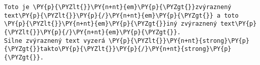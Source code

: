 \begin{Verbatim}[commandchars=\\\{\}]
Toto je \PY{p}{\PYZlt{}}\PY{n+nt}{em}\PY{p}{\PYZgt{}}zvýraznený text\PY{p}{\PYZlt{}}\PY{p}{/}\PY{n+nt}{em}\PY{p}{\PYZgt{}} a toto \PY{p}{\PYZlt{}}\PY{n+nt}{em}\PY{p}{\PYZgt{}}iný zvýraznený text\PY{p}{\PYZlt{}}\PY{p}{/}\PY{n+nt}{em}\PY{p}{\PYZgt{}}.
Silne zvýraznený text vyzerá \PY{p}{\PYZlt{}}\PY{n+nt}{strong}\PY{p}{\PYZgt{}}takto\PY{p}{\PYZlt{}}\PY{p}{/}\PY{n+nt}{strong}\PY{p}{\PYZgt{}}.
\end{Verbatim}
